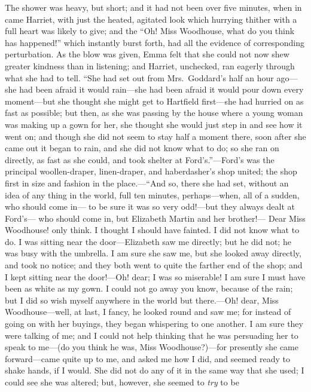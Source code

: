 The shower was heavy, but short; and it had not been over five minutes,
when in came Harriet, with just the heated, agitated look which
hurrying thither with a full heart was likely to give; and the
``Oh! Miss Woodhouse, what do you think has happened!'' which instantly
burst forth, had all the evidence of corresponding perturbation.
As the blow was given, Emma felt that she could not now shew greater
kindness than in listening; and Harriet, unchecked, ran eagerly
through what she had to tell.  ``She had set out from Mrs.\ Goddard's
half an hour ago---she had been afraid it would rain---she had been
afraid it would pour down every moment---but she thought she might
get to Hartfield first---she had hurried on as fast as possible;
but then, as she was passing by the house where a young woman
was making up a gown for her, she thought she would just step
in and see how it went on; and though she did not seem to stay
half a moment there, soon after she came out it began to rain,
and she did not know what to do; so she ran on directly, as fast
as she could, and took shelter at Ford's.''---Ford's was the principal
woollen-draper, linen-draper, and haberdasher's shop united;
the shop first in size and fashion in the place.---``And so,
there she had set, without an idea of any thing in the world,
full ten minutes, perhaps---when, all of a sudden, who should come in---%
to be sure it was so very odd!---but they always dealt at Ford's---%
who should come in, but Elizabeth Martin and her brother!---%
Dear Miss Woodhouse! only think.  I thought I should have fainted.
I did not know what to do.  I was sitting near the door---Elizabeth saw
me directly; but he did not; he was busy with the umbrella.
I am sure she saw me, but she looked away directly, and took
no notice; and they both went to quite the farther end of the shop;
and I kept sitting near the door!---Oh! dear; I was so miserable!
I am sure I must have been as white as my gown.  I could not go away
you know, because of the rain; but I did so wish myself anywhere
in the world but there.---Oh! dear, Miss Woodhouse---well, at last,
I fancy, he looked round and saw me; for instead of going
on with her buyings, they began whispering to one another.
I am sure they were talking of me; and I could not help thinking
that he was persuading her to speak to me---(do you think he was,
Miss Woodhouse?)---for presently she came forward---came quite up
to me, and asked me how I did, and seemed ready to shake hands,
if I would.  She did not do any of it in the same way that she used;
I could see she was altered; but, however, she seemed to \emph{try} to be
